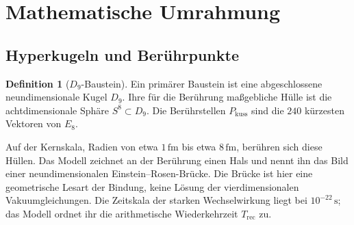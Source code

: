 \documentclass[11pt,a4paper]{article}
\theoremstyle{definition}
\newtheorem{definition}{Definition}[section]
\theoremstyle{remark}
\newcommand{\Dn}{D_9}
\newcommand{\Ee}{E_8}
\newcommand{\Vf}{V_4}
\newcommand{\EB}{E_{\mathrm{B}}}
\begin{document}
\section{Mathematische Umrahmung}
\label{sec:math}

\subsection{Hyperkugeln und Berührpunkte}

\begin{definition}[\(\Dn\)-Baustein]
Ein primärer Baustein ist eine abgeschlossene neundimensionale Kugel \(\Dn\). Ihre für die Berührung maßgebliche Hülle ist die achtdimensionale Sphäre \(S^8\subset\Dn\). Die Berührstellen \(P_{\mathrm{kuss}}\) sind die \(240\) kürzesten Vektoren von \(\Ee\).
\end{definition}

Auf der Kernskala, Radien von etwa \(1\,\mathrm{fm}\) bis etwa \(8\,\mathrm{fm}\), berühren sich diese Hüllen. Das Modell zeichnet an der Berührung einen Hals und nennt ihn das Bild einer neundimensionalen Einstein--Rosen-Brücke. Die Brücke ist hier eine geometrische Lesart der Bindung, keine Lösung der vierdimensionalen Vakuumgleichungen. Die Zeitskala der starken Wechselwirkung liegt bei \(10^{-22}\,\mathrm{s}\); das Modell ordnet ihr die arithmetische Wiederkehrzeit \(T_{\mathrm{rec}}\) zu.

\vspace{0.5em}
\begin{center}
\end{center}
\vspace{0.3em}
\end{document}
